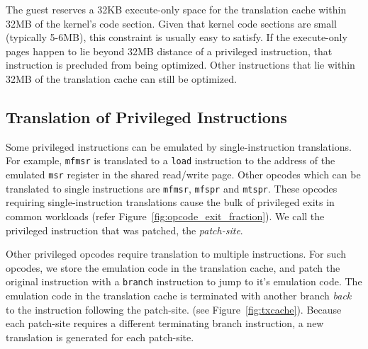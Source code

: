 \documentclass[10pt,twocolumn]{article}
\begin{document}
The guest reserves a 32KB execute-only space for the
translation cache within 32MB of the kernel's code
section. Given that kernel code sections are small (typically 5-6MB),
this constraint is usually easy to satisfy. If the execute-only
pages happen to lie beyond 32MB distance of a privileged instruction, that
instruction is precluded from being optimized. Other instructions that lie
within 32MB of the translation cache can still be optimized.

\subsection{Translation of Privileged Instructions}
Some privileged instructions can
be emulated by single-instruction translations. For example, {\tt mfmsr} is translated
to a {\tt load} instruction to the address of the emulated {\tt msr}
register in the shared read/write page. Other opcodes which can be
translated to single instructions are {\tt mfmsr}, {\tt mfspr} and {\tt mtspr}.
These opcodes requiring single-instruction translations cause the bulk of
privileged exits in common workloads (refer Figure~\ref{fig:opcode_exit_fraction}).
We call the privileged instruction
that was patched, the {\em patch-site}. 

Other privileged opcodes require translation to multiple instructions.
For such opcodes, we store the emulation code in the translation cache, and
patch the original instruction with a {\tt branch} instruction to jump to it's
emulation code. The emulation code in the
translation cache is terminated
with another branch {\em back} to the instruction following the patch-site.
(see Figure~\ref{fig:txcache}). Because each patch-site requires a different
terminating branch instruction, a new translation is generated for
each patch-site.

\end{document}
